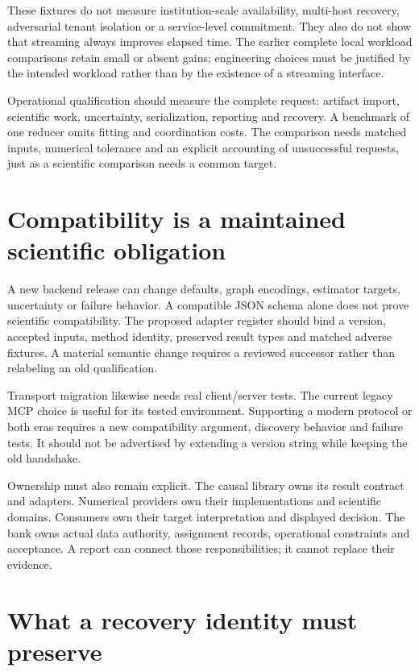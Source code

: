 These fixtures do not measure institution-scale availability, multi-host
recovery, adversarial tenant isolation or a service-level commitment. They also
do not show that streaming always improves elapsed time. The earlier complete
local workload comparisons retain small or absent gains; engineering choices
must be justified by the intended workload rather than by the existence of a
streaming interface.

Operational qualification should measure the complete request: artifact import,
scientific work, uncertainty, serialization, reporting and recovery. A benchmark
of one reducer omits fitting and coordination costs. The comparison needs
matched inputs, numerical tolerance and an explicit accounting of unsuccessful
requests, just as a scientific comparison needs a common target.

\section{Compatibility is a maintained scientific obligation}

A new backend release can change defaults, graph encodings, estimator targets,
uncertainty or failure behavior. A compatible JSON schema alone does not prove
scientific compatibility. The proposed adapter register should bind a version,
accepted inputs, method identity, preserved result types and matched adverse
fixtures. A material semantic change requires a reviewed successor rather than
relabeling an old qualification.

Transport migration likewise needs real client/server tests. The current legacy
MCP choice is useful for its tested environment. Supporting a modern protocol
or both eras requires a new compatibility argument, discovery behavior and
failure tests. It should not be advertised by extending a version string while
keeping the old handshake.

Ownership must also remain explicit. The causal library owns its result
contract and adapters. Numerical providers own their implementations and
scientific domains. Consumers own their target interpretation and displayed
decision. The bank owns actual data authority, assignment records, operational
constraints and acceptance. A report can connect those responsibilities; it
cannot replace their evidence.

\section{What a recovery identity must preserve}

